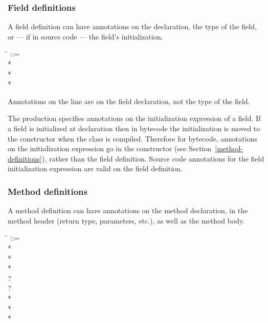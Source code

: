 \documentclass{article}
\begin{document}
\subsubsection{Field definitions\label{field-definitons}}

A field definition can have annotations on the declaration, the type of the
field, or --- if in source code --- the field's initialization.

\begin{tabbing}
\qquad \= \kill
{} ::= \\
\qquad    {}  \bnflit{:} * \lineend \\
\qquad        {}* \\
\qquad        {}*
\end{tabbing}

\noindent
Annotations on the  line are on the field declaration, not the
type of the field.

The  production specifies annotations on the
initialization expression of a field. If a field is initialized at declaration
then in bytecode the initialization is moved to the constructor when the class
is compiled. Therefore for bytecode, annotations on the initialization
expression go in the constructor (see Section~\ref{method-definitions}), rather
than the field definition. Source code annotations for the field initialization
expression are valid on the field definition.


\subsubsection{Method definitions\label{method-definitions}}

A method definition can have annotations on the method declaration, in the
method header (return type, parameters, etc.), as well as the method body.

\begin{tabbing}
\qquad \= \kill
{} ::= \\
\qquad    {}  \bnflit{:} * \lineend \\
\qquad        {}* \\
\qquad        {}* \\
\qquad        {}? \\
\qquad        {}? \\
\qquad        {}* \\
\qquad        {}* \\
\qquad        {}*
\end{tabbing}
\end{document}

